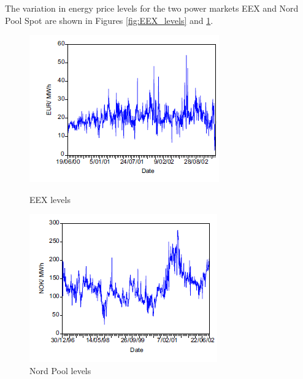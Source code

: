 The variation in energy price levels for the two power markets EEX and Nord Pool Spot are shown in Figures \ref{fig:EEX_levels} and \ref{fig:NordPool_levels}.

\begin{figure}[!htbp]
  \centering
  \begin{minipage}[b]{0.4\textwidth}
    \includegraphics[width=\textwidth]{figures/state_of_the_art/EEX_levels.PNG}
    \caption{EEX levels \cite{mugele2005stable}}
		\label{fig:EEX_levels}
  \end{minipage}
  \hfill
  \begin{minipage}[b]{0.4\textwidth}
    \includegraphics[width=\textwidth]{figures/state_of_the_art/NordPool_levels.PNG}
    \caption{Nord Pool levels \cite{mugele2005stable}}
		\label{fig:NordPool_levels}
  \end{minipage}
\end{figure}

